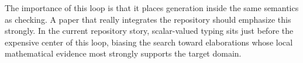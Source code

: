 The importance of this loop is that it places generation inside the same semantics as
checking. A paper that really integrates the repository should emphasize this strongly. In
the current repository story, scalar-valued typing sits just before the expensive center of
this loop, biasing the search toward elaborations whose local mathematical evidence most
strongly supports the target domain.
